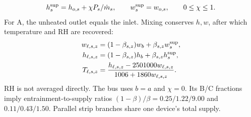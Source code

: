 \begin{equation}
 h_s^{\rm sup}=h_{o,s}+\chi P_s/\dot m_s,\qquad
 w_s^{\rm sup}=w_{o,s},\qquad 0\leq\chi\leq1.
\label{eq:supply-heat}
\end{equation}
For A, the unheated outlet equals the inlet. Mixing conserves $h,w$, after which temperature and RH are recovered:
\begin{align}
 w_{\ell,s,z}&=(1-\beta_{s,z})w_b+\beta_{s,z}w_s^{\rm sup},\\
 h_{\ell,s,z}&=(1-\beta_{s,z})h_b+\beta_{s,z}h_s^{\rm sup},\\
 T_{\ell,s,z}&=\frac{h_{\ell,s,z}-2501000w_{\ell,s,z}}{1006+1860w_{\ell,s,z}}.
\label{eq:mixing}
\end{align}
RH is not averaged directly. The bus uses $b=a$ and $\chi=0$. Its B/C fractions imply entrainment-to-supply ratios $(1-\beta)/\beta=0.25/1.22/9.00$ and $0.11/0.43/1.50$. Parallel strip branches share one device's total supply.

